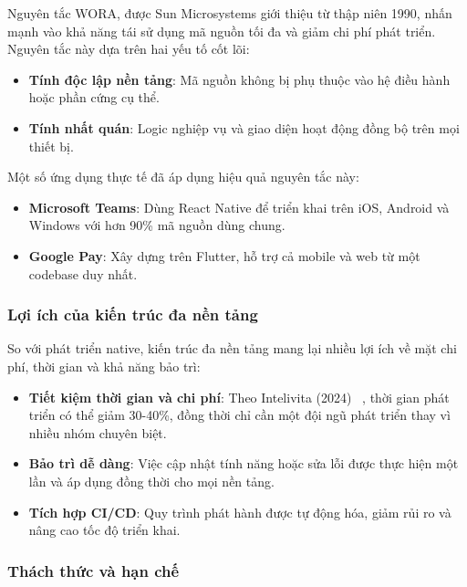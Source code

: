     Nguyên tắc WORA, được Sun Microsystems giới thiệu từ thập niên 1990, nhấn mạnh vào khả năng tái sử dụng mã nguồn tối đa và giảm chi phí phát triển. Nguyên tắc này dựa trên hai yếu tố cốt lõi:
    \setlength{\leftmargini}{1.5cm}
    \begin{itemize}
        \item \textbf{Tính độc lập nền tảng}: Mã nguồn không bị phụ thuộc vào hệ điều hành hoặc phần cứng cụ thể.
        \item \textbf{Tính nhất quán}: Logic nghiệp vụ và giao diện hoạt động đồng bộ trên mọi thiết bị.
    \end{itemize}
\vspace{0.5em}


    Một số ứng dụng thực tế đã áp dụng hiệu quả nguyên tắc này:
    \setlength{\leftmargini}{1.5cm}
    \begin{itemize}
        \item \textbf{Microsoft Teams}: Dùng React Native để triển khai trên iOS, Android và Windows với hơn 90\% mã nguồn dùng chung.
        \item \textbf{Google Pay}: Xây dựng trên Flutter, hỗ trợ cả mobile và web từ một codebase duy nhất.
    \end{itemize}

\subsubsection{Lợi ích của kiến trúc đa nền tảng}

    So với phát triển native, kiến trúc đa nền tảng mang lại nhiều lợi ích về mặt chi phí, thời gian và khả năng bảo trì:
    \setlength{\leftmargini}{1.5cm}
    \begin{itemize}
        \item \textbf{Tiết kiệm thời gian và chi phí}: Theo Intelivita (2024) ~\cite{infoq2022}, thời gian phát triển có thể giảm 30-40\%, đồng thời chỉ cần một đội ngũ phát triển thay vì nhiều nhóm chuyên biệt.
        \item \textbf{Bảo trì dễ dàng}: Việc cập nhật tính năng hoặc sửa lỗi được thực hiện một lần và áp dụng đồng thời cho mọi nền tảng.
        \item \textbf{Tích hợp CI/CD}: Quy trình phát hành được tự động hóa, giảm rủi ro và nâng cao tốc độ triển khai.
    \end{itemize}

\subsubsection{Thách thức và hạn chế}

